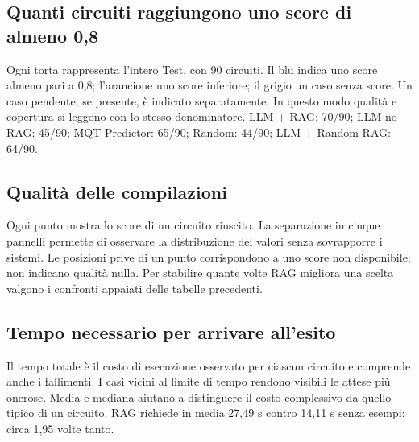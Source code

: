 \subsection{Quanti circuiti raggiungono uno score di almeno 0,8}
\begingroup\small Ogni torta rappresenta l’intero Test, con 90 circuiti. Il blu indica uno score almeno pari a 0,8; l’arancione uno score inferiore; il grigio un caso senza score. Un caso pendente, se presente, è indicato separatamente. In questo modo qualità e copertura si leggono con lo stesso denominatore. LLM + RAG: 70/90; LLM no RAG: 45/90; MQT Predictor: 65/90; Random: 44/90; LLM + Random RAG: 64/90.\par\endgroup
\begin{center}

\end{center}\restoregeometry
\clearpage{}\captionsetup{hypcap=false}
\subsection{Qualità delle compilazioni}
\begingroup\small Ogni punto mostra lo score di un circuito riuscito. La separazione in cinque pannelli permette di osservare la distribuzione dei valori senza sovrapporre i sistemi. Le posizioni prive di un punto corrispondono a uno score non disponibile; non indicano qualità nulla. Per stabilire quante volte RAG migliora una scelta valgono i confronti appaiati delle tabelle precedenti.\par\endgroup
\begin{center}

\end{center}\restoregeometry
\clearpage{}\captionsetup{hypcap=false}
\subsection{Tempo necessario per arrivare all’esito}
\begingroup\small Il tempo totale è il costo di esecuzione osservato per ciascun circuito e comprende anche i fallimenti. I casi vicini al limite di tempo rendono visibili le attese più onerose. Media e mediana aiutano a distinguere il costo complessivo da quello tipico di un circuito. RAG richiede in media 27,49 s contro 14,11 s senza esempi: circa 1,95 volte tanto.\par\endgroup
\begin{center}

\end{center}\restoregeometry
\clearpage{}\captionsetup{hypcap=false}
